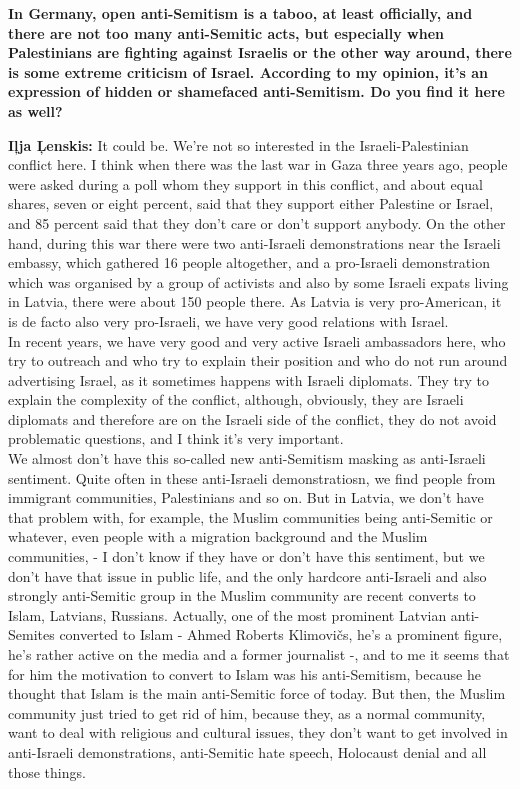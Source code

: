 \textbf{In Germany, open anti-Semitism is a taboo, at least officially, and there are not too many anti-Semitic acts, but especially when Palestinians are fighting against Israelis or the other way around, there is some extreme criticism of Israel. According to my opinion, it’s an expression of hidden or shamefaced anti-Semitism. Do you find it here as well?}

\textbf{Iļja Ļenskis:} It could be. We’re not so interested in the Israeli-Palestinian conflict here. I think when there was the last war in Gaza three years ago, people were asked during a poll whom they support in this conflict, and about equal shares, seven or eight percent, said that they support either Palestine or Israel, and 85 percent said that they don’t care or don’t support anybody. On the other hand, during this war there were two anti-Israeli demonstrations near the Israeli embassy, which gathered 16 people altogether, and a pro-Israeli demonstration which was organised by a group of activists and also by some Israeli expats living in Latvia, there were about 150 people there. As Latvia is very pro-American, it is de facto also very pro-Israeli, we have very good relations with Israel.\\ 
In recent years, we have very good and very active Israeli ambassadors here, who try to outreach and who try to explain their position and who do not run around advertising Israel, as it sometimes happens with Israeli diplomats. They try to explain the complexity of the conflict, although, obviously, they are Israeli diplomats and therefore are on the Israeli side of the conflict, they do not avoid problematic questions, and I think it's very important.\\
We almost don’t have this so-called new anti-Semitism masking as anti-Israeli sentiment. Quite often in these anti-Israeli demonstratiosn, we find people from immigrant communities, Palestinians and so on. But in Latvia, we don’t have that problem with, for example, the Muslim communities being anti-Semitic or whatever, even people with a migration background and the Muslim communities, - I don’t know if they have or don’t have this sentiment, but we don’t have that issue in public life, and the only hardcore anti-Israeli and also strongly anti-Semitic group in the Muslim community are recent converts to Islam, Latvians, Russians. Actually, one of the most prominent Latvian anti-Semites converted to Islam - Ahmed Roberts Klimovičs, he’s a prominent figure, he’s rather active on the media and a former journalist -, and to me it seems that for him the motivation to convert to Islam was his anti-Semitism, because he thought that Islam is the main anti-Semitic force of today. But then, the Muslim community just tried to get rid of him, because they, as a normal community, want to deal with religious and cultural issues, they don’t want to get involved in anti-Israeli demonstrations, anti-Semitic hate speech, Holocaust denial and all those things. \\
